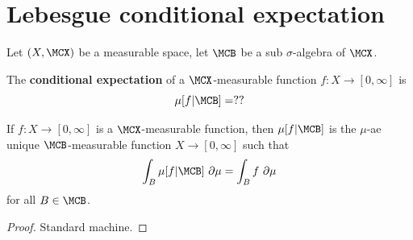 \section{Lebesgue conditional expectation}

Let $(X, \MCX)$ be a measurable space, let $\MCB$ be a sub $\sigma$-algebra of $\MCX$.

\begin{definition}
  \label{def:lebesgue-cond-exp}
  \leanok{}

  The {\bf conditional expectation} of a $\MCX$-measurable function $f : X \to [0, \infty]$ is
  \[\mu[f | \MCB] = ??\]
\end{definition}

\begin{lemma}
  \label{lem:lebesgue-cond-exp-char}
  \leanok{}

  If $f : X \to [0, \infty]$ is a $\MCX$-measurable function, then $\mu[f | \MCB]$ is the $\mu$-ae unique $\MCB$-measurable function $X \to [0, \infty]$ such that
  \[\int_B \mu[f | \MCB]\ \partial\mu = \int_B f\ \partial\mu\]
  for all $B \in \MCB$.
\end{lemma}
\begin{proof}

  Standard machine.
\end{proof}
